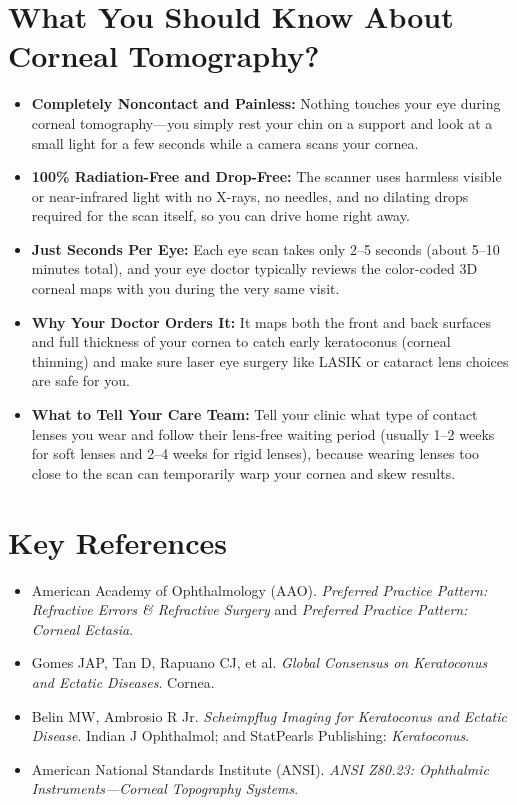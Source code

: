 \section{What You Should Know About Corneal Tomography?}
\begin{itemize}
    \item \textbf{Completely Noncontact and Painless:} Nothing touches your eye during corneal tomography---you simply rest your chin on a support and look at a small light for a few seconds while a camera scans your cornea.
    \item \textbf{100\% Radiation-Free and Drop-Free:} The scanner uses harmless visible or near-infrared light with no X-rays, no needles, and no dilating drops required for the scan itself, so you can drive home right away.
    \item \textbf{Just Seconds Per Eye:} Each eye scan takes only 2--5 seconds (about 5--10 minutes total), and your eye doctor typically reviews the color-coded 3D corneal maps with you during the very same visit.
    \item \textbf{Why Your Doctor Orders It:} It maps both the front and back surfaces and full thickness of your cornea to catch early keratoconus (corneal thinning) and make sure laser eye surgery like LASIK or cataract lens choices are safe for you.
    \item \textbf{What to Tell Your Care Team:} Tell your clinic what type of contact lenses you wear and follow their lens-free waiting period (usually 1--2 weeks for soft lenses and 2--4 weeks for rigid lenses), because wearing lenses too close to the scan can temporarily warp your cornea and skew results.
\end{itemize}

\section{Key References}
\begin{itemize}
    \item American Academy of Ophthalmology (AAO). \textit{Preferred Practice Pattern: Refractive Errors \& Refractive Surgery} and \textit{Preferred Practice Pattern: Corneal Ectasia}.
    \item Gomes JAP, Tan D, Rapuano CJ, et al. \textit{Global Consensus on Keratoconus and Ectatic Diseases}. Cornea.
    \item Belin MW, Ambrosio R Jr. \textit{Scheimpflug Imaging for Keratoconus and Ectatic Disease}. Indian J Ophthalmol; and StatPearls Publishing: \textit{Keratoconus}.
    \item American National Standards Institute (ANSI). \textit{ANSI Z80.23: Ophthalmic Instruments---Corneal Topography Systems}.
\end{itemize}
